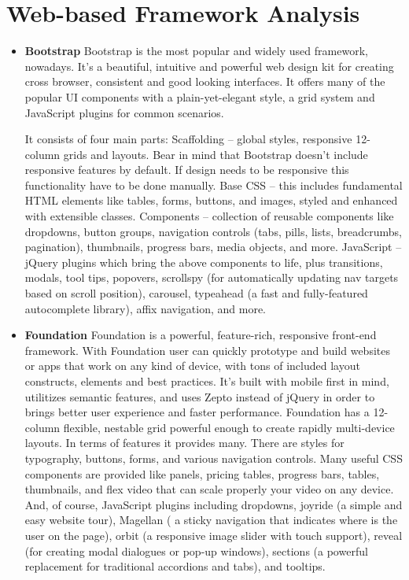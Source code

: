 \section{Web-based Framework Analysis}
 \begin{itemize}
	\item \textbf{Bootstrap}
	\newline
	Bootstrap is the most popular and widely used framework, nowadays. It’s a beautiful, intuitive and powerful web design kit for creating cross browser, consistent and good looking interfaces. It offers many of the popular UI components with a plain-yet-elegant style, a grid system and JavaScript plugins for common scenarios.

	It consists of four main parts:
	Scaffolding – global styles, responsive 12-column grids and layouts. Bear in mind that Bootstrap doesn’t include responsive features by default. If design needs to be responsive this functionality have to be done manually. Base CSS – this includes fundamental HTML elements like tables, forms, buttons, and images, styled and enhanced with extensible classes. Components – collection of reusable components like dropdowns, button groups, navigation controls (tabs, pills, lists, breadcrumbs, pagination), thumbnails, progress bars, media objects, and more. JavaScript – jQuery plugins which bring the above components to life, plus transitions, modals, tool tips, popovers, scrollspy (for automatically updating nav targets based on scroll position), carousel, typeahead (a fast and fully-featured autocomplete library), affix navigation, and more.
	\item \textbf{Foundation}
	\newline
	Foundation is a powerful, feature-rich, responsive front-end framework. With Foundation user can quickly prototype and build websites or apps that work on any kind of device, with tons of included layout constructs, elements and best practices. It’s built with mobile first in mind, utilitizes semantic features, and uses Zepto instead of jQuery in order to brings better user experience and faster performance.
	\newline
	Foundation has a 12-column flexible, nestable grid powerful enough to create rapidly multi-device layouts. In terms of features it provides many. There are styles for typography, buttons, forms, and various navigation controls. Many useful CSS components are provided like panels, pricing tables, progress bars, tables, thumbnails, and flex video that can scale properly your video on any device. And, of course, JavaScript plugins including dropdowns, joyride (a simple and easy website tour), Magellan ( a sticky navigation that indicates where is the user on the page), orbit (a responsive image slider with touch support), reveal (for creating modal dialogues or pop-up windows),  sections (a powerful replacement for traditional accordions and tabs), and tooltips.

\end{itemize}
